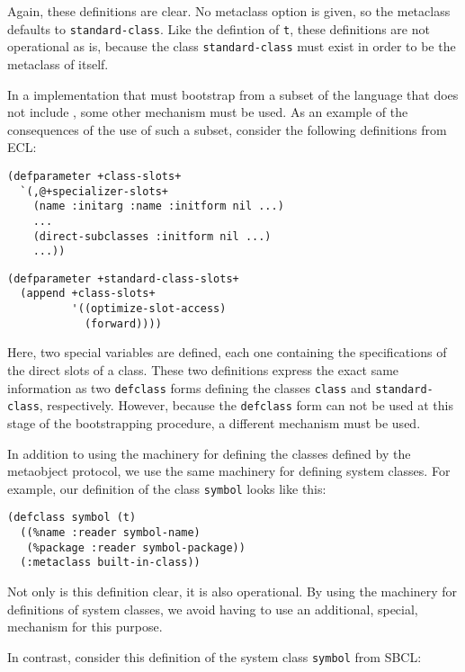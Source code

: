 \noindent
Again, these definitions are clear.  No metaclass option is given, so
the metaclass defaults to \texttt{standard-class}.  Like the defintion
of \texttt{t}, these definitions are not operational as is, because
the class \texttt{standard-class} must exist in order to be the
metaclass of itself.

In a \commonlisp{} implementation that must bootstrap \clos{} from a
subset of the language that does not include \clos{}, some other
mechanism must be used.  As an example of the consequences of the use
of such a subset, consider the following definitions from ECL:

\begin{verbatim}
(defparameter +class-slots+
  `(,@+specializer-slots+
    (name :initarg :name :initform nil ...)
    ...
    (direct-subclasses :initform nil ...)
    ...))
\end{verbatim}

\begin{verbatim}
(defparameter +standard-class-slots+
  (append +class-slots+
          '((optimize-slot-access)
            (forward))))
\end{verbatim}

\noindent
Here, two special variables are defined, each one containing the
specifications of the direct slots of a class.  These two definitions
express the exact same information as two \texttt{defclass} forms
defining the classes \texttt{class} and \texttt{standard-class},
respectively.  However, because the \texttt{defclass} form can not be
used at this stage of the bootstrapping procedure, a different mechanism
must be used.

In addition to using the \clos{} machinery for defining the classes
defined by the metaobject protocol, we use the same machinery for
defining system classes.  For example, our definition of the class
\texttt{symbol} looks like this:

\begin{verbatim}
(defclass symbol (t)
  ((%name :reader symbol-name)
   (%package :reader symbol-package))
  (:metaclass built-in-class))
\end{verbatim}

\noindent
Not only is this definition clear, it is also operational.  By using
the \clos{} machinery for definitions of system classes, we avoid
having to use an additional, special, mechanism for this purpose.

In contrast, consider this definition of the system class
\texttt{symbol} from SBCL:

